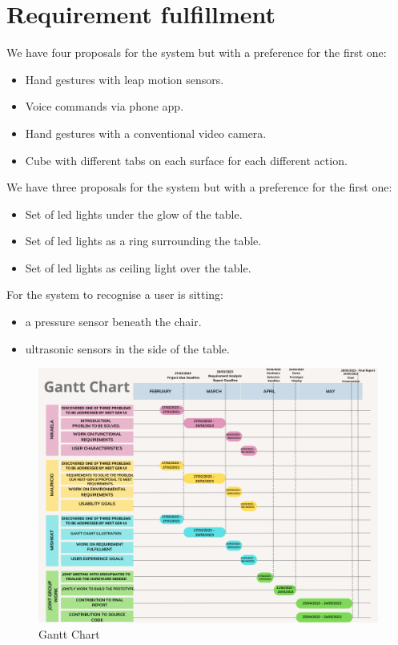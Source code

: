 \documentclass{article}
\begin{document}
\section{Requirement fulfillment}
We have four proposals for the system but with a preference for the first one:
\begin{itemize}
    \item Hand gestures with leap motion sensors.
    \item Voice commands via phone app.
    \item Hand gestures with a conventional video camera.
    \item Cube with different tabs on each surface for each different action.
\end{itemize}
We have three proposals for the system but with a preference for the first one:
\begin{itemize}
    \item Set of led lights under the glow of the table.
    \item Set of led lights as a ring surrounding the table.
    \item Set of led lights as ceiling light over the table.
\end{itemize}
For the system to recognise a user is sitting:
\begin{itemize}
    \item a pressure sensor beneath the chair.
    \item ultrasonic sensors in the side of the table.
\end{itemize}

\begin{figure}[!htb]
\centering
\includegraphics[width=\linewidth]{GanttChart.png}
\caption{Gantt Chart}
\label{}
\end{figure}



\end{document}
